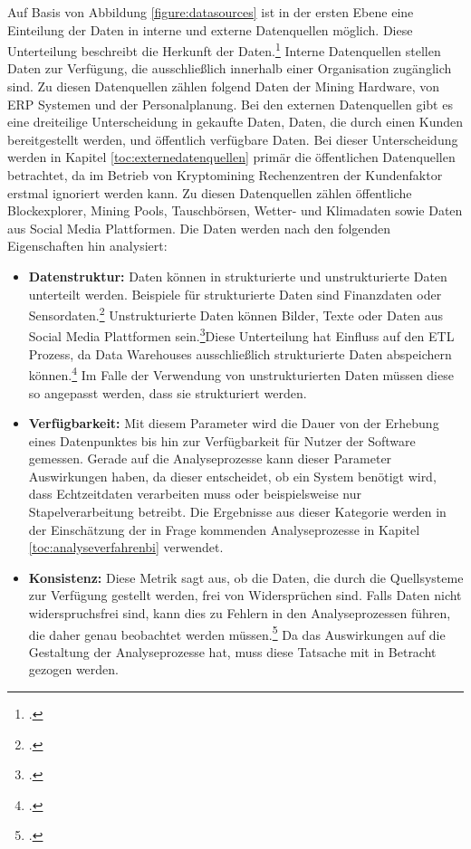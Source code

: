 Auf Basis von Abbildung \ref{figure:datasources} ist in der ersten Ebene eine Einteilung der Daten in interne und externe
Datenquellen möglich. Diese Unterteilung beschreibt die Herkunft der Daten.\footcite[Cf.][Fig. 1]{hartmann2016capturing}
Interne Datenquellen stellen Daten zur Verfügung, die ausschließlich innerhalb einer Organisation zugänglich sind. Zu diesen
Datenquellen zählen folgend Daten der Mining Hardware, von \ac{ERP} Systemen und der Personalplanung. Bei den externen
Datenquellen gibt es eine dreiteilige Unterscheidung in gekaufte Daten, Daten, die durch einen Kunden bereitgestellt werden,
und öffentlich verfügbare Daten. Bei dieser Unterscheidung werden in Kapitel \ref{toc:externedatenquellen} primär die
öffentlichen Datenquellen betrachtet, da im Betrieb von Kryptomining Rechenzentren der Kundenfaktor erstmal ignoriert werden
kann. Zu diesen Datenquellen zählen öffentliche Blockexplorer, Mining Pools, Tauschbörsen, Wetter- und Klimadaten sowie
Daten aus Social Media Plattformen. Die Daten werden nach den folgenden Eigenschaften hin analysiert:
\begin{itemize}
    \item \textbf{Datenstruktur: }Daten können in strukturierte und unstrukturierte Daten unterteilt werden. Beispiele für
    strukturierte Daten sind Finanzdaten oder Sensordaten.\footcite[Cf.][p. 27]{kimble2015big} Unstrukturierte Daten
    können Bilder, Texte oder Daten aus Social Media Plattformen sein.\footcite[Cf.][p. 27]{kimble2015big}Diese Unterteilung
    hat Einfluss auf den \ac{ETL} Prozess, da Data Warehouses ausschließlich strukturierte Daten abspeichern
    können.\footcite[Cf.][p. 21]{niu2009cognition} Im Falle der Verwendung von unstrukturierten Daten müssen diese so angepasst
    werden, dass sie strukturiert werden.
    \item \textbf{Verfügbarkeit: }Mit diesem Parameter wird die Dauer von der Erhebung eines Datenpunktes bis hin zur
    Verfügbarkeit für Nutzer der Software gemessen. Gerade auf die Analyseprozesse kann dieser Parameter Auswirkungen
    haben, da dieser entscheidet, ob ein System benötigt wird, dass Echtzeitdaten verarbeiten muss oder beispielsweise nur
    Stapelverarbeitung betreibt. Die Ergebnisse aus dieser Kategorie werden in der Einschätzung der in Frage kommenden
    Analyseprozesse in Kapitel \ref{toc:analyseverfahrenbi} verwendet.
    \item \textbf{Konsistenz: }Diese Metrik sagt aus, ob die Daten, die durch die Quellsysteme zur Verfügung gestellt werden,
    frei von Widersprüchen sind. Falls Daten nicht widerspruchsfrei sind, kann dies zu Fehlern in den Analyseprozessen führen,
    die daher genau beobachtet werden müssen.\footcite[Cf.][p. 561]{huh1990data} Da das Auswirkungen auf die Gestaltung
    der Analyseprozesse hat, muss diese Tatsache mit in Betracht gezogen werden.
\end{itemize}

